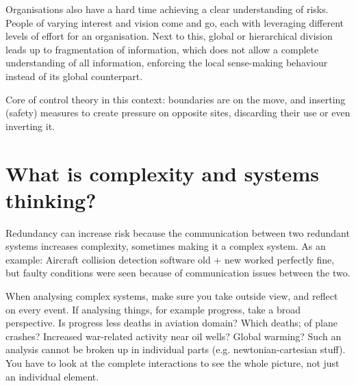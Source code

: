 Organisations also have a hard time achieving a clear understanding of risks. 
People of varying interest and vision come and go, each with leveraging different levels of effort for an organisation.
Next to this, global or hierarchical division leads up to fragmentation of information, which does not allow a complete understanding of all information, enforcing the local sense-making behaviour instead of its global counterpart.

Core of control theory in this context: boundaries are on the move, and inserting (safety) measures to create pressure on opposite sites, discarding their use or even inverting it.

\section{What is complexity and systems thinking?}
Redundancy can increase risk because the communication between two redundant systems increases complexity, sometimes making it a complex system. 
As an example: Aircraft collision detection software old + new worked perfectly fine, but faulty conditions were seen because of communication issues between the two.

When analysing complex systems, make sure you take outside view, and reflect on every event.
If analysing things, for example progress, take a broad perspective.
Is progress less deaths in aviation domain? Which deaths; of plane crashes? 
Increased war-related activity near oil wells? 
Global warming?
Such an analysis cannot be broken up in individual parts (e.g. newtonian-cartesian stuff). 
You have to look at the complete interactions to see the whole picture, not just an individual element.


